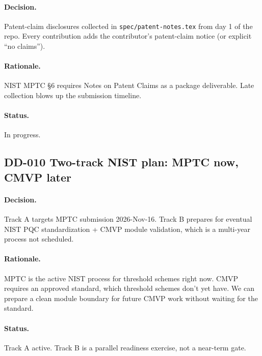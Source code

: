 \paragraph{Decision.}
Patent-claim disclosures collected in
\texttt{spec/patent-notes.tex} from day 1 of the repo. Every
contribution adds the contributor's patent-claim notice (or explicit
``no claims'').

\paragraph{Rationale.}
NIST MPTC \S6 requires Notes on Patent Claims as a package
deliverable. Late collection blows up the submission timeline.

\paragraph{Status.}
In progress.

\subsection{DD-010 Two-track NIST plan: MPTC now, CMVP later}

\paragraph{Decision.}
Track A targets MPTC submission 2026-Nov-16. Track B prepares for
eventual NIST PQC standardization + CMVP module validation, which is
a multi-year process not scheduled.

\paragraph{Rationale.}
MPTC is the active NIST process for threshold schemes right now.
CMVP requires an approved standard, which threshold schemes don't
yet have. We can prepare a clean module boundary for future CMVP
work without waiting for the standard.

\paragraph{Status.}
Track A active. Track B is a parallel readiness exercise, not a
near-term gate.
